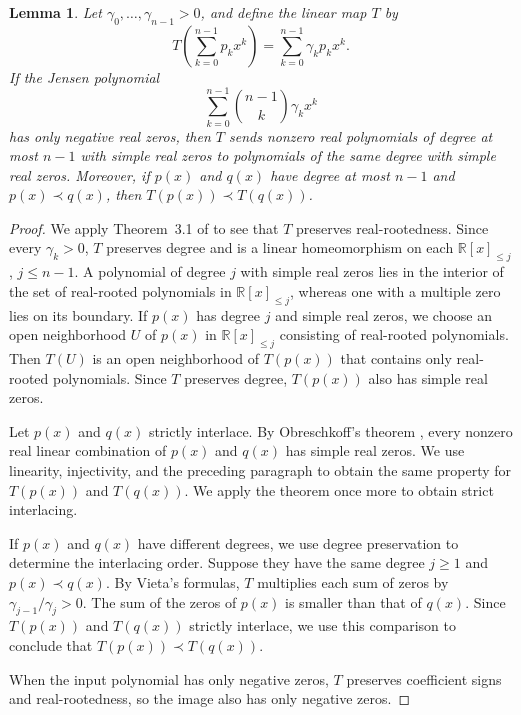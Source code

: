 \documentclass[11pt]{article}
\numberwithin{equation}{section}
\newtheorem{lemma}[theorem]{Lemma}
\theoremstyle{remark}\newtheorem{remark}[theorem]{Remark}
\begin{document}
\begin{lemma}\label{c:lem:strictmult}
Let $\gamma_0,\ldots,\gamma_{n-1}>0$, and define the linear map $T$ by
\[
 T\!\left(\sum_{k=0}^{n-1}p_kx^k\right)=
 \sum_{k=0}^{n-1}\gamma_kp_kx^k.
\]
If the Jensen polynomial
\[
 \sum_{k=0}^{n-1}\binom{n-1}{k}\gamma_kx^k
\]
has only negative real zeros, then $T$ sends nonzero real polynomials
of degree at most $n-1$ with simple real zeros to polynomials of the same
degree with simple real zeros. Moreover, if $p(x)$ and $q(x)$ have degree
at most $n-1$ and $p(x)\prec q(x)$, then $T(p(x))\prec T(q(x))$.
\end{lemma}
\begin{proof}
We apply Theorem~3.1 of \cite{CC} to see that $T$ preserves real-rootedness.
Since every $\gamma_k>0$, $T$ preserves degree and is a linear
homeomorphism on each $\mathbb R[x]_{\le j}$, $j\le n-1$.
A polynomial of degree $j$ with simple real zeros lies in the interior of
the set of real-rooted polynomials in $\mathbb R[x]_{\le j}$,
whereas one with a multiple zero lies on its boundary.
If $p(x)$ has degree $j$ and simple real zeros, we choose an open
neighborhood $U$ of $p(x)$ in $\mathbb R[x]_{\le j}$ consisting
of real-rooted polynomials. Then $T(U)$ is an open neighborhood
of $T(p(x))$ that contains only real-rooted polynomials. Since $T$ preserves
degree, $T(p(x))$ also has simple real zeros.

Let $p(x)$ and $q(x)$ strictly interlace. By Obreschkoff's theorem
\cite[Theorem 8]{Branden}, every nonzero real linear combination of
$p(x)$ and $q(x)$ has simple real zeros. We use linearity, injectivity, and
the preceding paragraph to obtain the same property for $T(p(x))$ and
$T(q(x))$. We apply the theorem once more to obtain strict interlacing.

If $p(x)$ and $q(x)$ have different degrees, we use degree
preservation to determine the interlacing order. Suppose they have the
same degree $j\ge1$ and $p(x)\prec q(x)$. By Vieta's formulas, $T$
multiplies each sum of zeros by $\gamma_{j-1}/\gamma_j>0$.
The sum of the zeros of $p(x)$ is smaller than that of $q(x)$.
Since $T(p(x))$ and $T(q(x))$ strictly interlace, we use this comparison
to conclude that $T(p(x))\prec T(q(x))$.

When the input polynomial has only negative zeros, $T$ preserves
coefficient signs and real-rootedness, so the image also has only negative zeros.
\end{proof}
\end{document}
